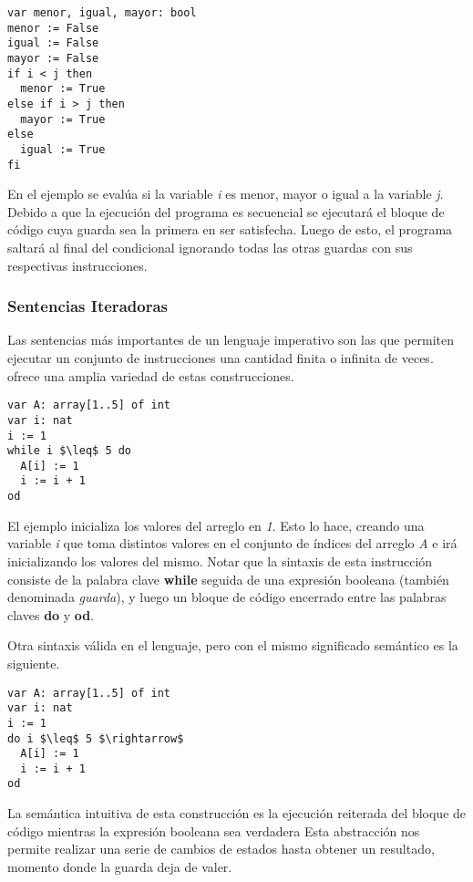\documentclass{article}
\begin{document}
\begin{lstlisting}
var menor, igual, mayor: bool
menor := False
igual := False
mayor := False
if i < j then
  menor := True
else if i > j then
  mayor := True
else
  igual := True
fi
\end{lstlisting}

En el ejemplo se evalúa si la variable \textit{i} es menor, mayor o igual a la variable \textit{j}.
Debido a que la ejecución del programa es secuencial se ejecutará el bloque de código cuya guarda sea la primera en ser satisfecha.
Luego de esto, el programa saltará al final del condicional ignorando todas las otras guardas con sus respectivas instrucciones.

\subsubsection{Sentencias Iteradoras}

Las sentencias más importantes de un lenguaje imperativo son las que permiten ejecutar un conjunto de instrucciones una cantidad finita o infinita de veces.
\Lang\space ofrece una amplia variedad de estas construcciones.

\begin{lstlisting}
var A: array[1..5] of int
var i: nat
i := 1
while i $\leq$ 5 do
  A[i] := 1
  i := i + 1
od
\end{lstlisting}

El ejemplo inicializa los valores del arreglo en \textit{1}.
Esto lo hace, creando una variable \textit{i} que toma distintos valores en el conjunto de índices del arreglo \textit{A} e irá inicializando los valores del mismo.
Notar que la sintaxis de esta instrucción consiste de la palabra clave \textbf{while} seguida de una expresión booleana (también denominada \textit{guarda}), y luego un bloque de código encerrado entre las palabras claves \textbf{do} y \textbf{od}.

Otra sintaxis válida en el lenguaje, pero con el mismo significado semántico es la siguiente.

\begin{lstlisting}
var A: array[1..5] of int
var i: nat
i := 1
do i $\leq$ 5 $\rightarrow$
  A[i] := 1
  i := i + 1
od
\end{lstlisting}

La semántica intuitiva de esta construcción es la ejecución reiterada del bloque de código mientras la expresión booleana sea verdadera
Esta abstracción nos permite realizar una serie de cambios de estados hasta obtener un resultado, momento donde la guarda deja de valer.
\end{document}
